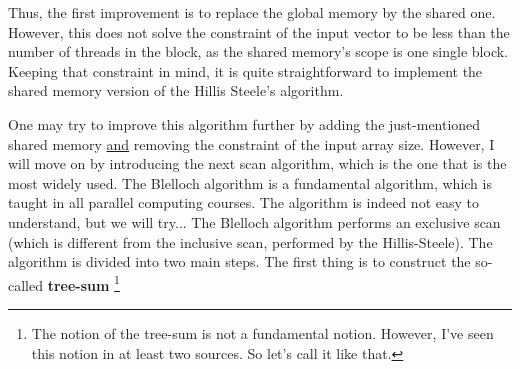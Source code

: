 Thus, the first improvement is to replace the global memory by the shared one. However, this does not solve the constraint 
of the input vector to be less than the number of threads in the block, as the shared memory's scope is one single block. 
Keeping that constraint in mind, it is quite straightforward to implement the shared memory version of the Hillis Steele's 
algorithm. 


One may try to improve this algorithm further by adding the just-mentioned shared memory \underline{and} removing the constraint of the input array size.
However, I will move on by introducing the next scan algorithm, which is the one that is the most widely used. The Blelloch algorithm is a fundamental 
algorithm, which is taught in all parallel computing courses. The algorithm is indeed not easy to understand, but we will try... The Blelloch algorithm 
performs an exclusive scan (which is different from the inclusive scan, performed by the Hillis-Steele). The algorithm is divided into two main steps. 
The first thing is to construct the so-called \textbf{tree-sum} \footnote{The notion of the tree-sum is not a fundamental notion. However, I've seen this notion in at least two 
sources. So let's call it like that.}

